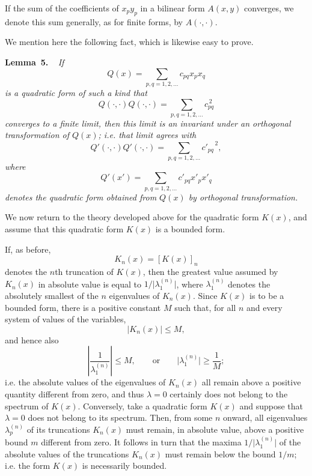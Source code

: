 \documentclass[b5paper,twoside]{article}
\makeatletter
\newcommand{\hilbertstatementname}[2]{%
  \textbf{#1\if\relax\detokenize{#2}\relax\else\ #2\fi.}%
}
\newenvironment{lemma}[1][]{%
  \par\addvspace{.7\baselineskip}%
  \phantomsection
  \protected@edef\@currentlabel{#1}%
  \noindent\hilbertstatementname{Lemma}{#1}\ \itshape\ignorespaces
}{%
  \par\addvspace{.7\baselineskip}%
}
\newcommand{\originalpage}[1]{\phantomsection\label{origpage:#1}}
\makeatother
\begin{document}
If the sum of the coefficients of $x_p y_p$ in a bilinear form $A(x,y)$
converges, we denote this sum generally, as for finite forms, by
$A(\mathord{\cdot},\mathord{\cdot})$.

\originalpage{182}
We mention here the following fact, which is likewise easy to prove.

\begin{lemma}[5]\label{lem:5}
If
\[
  Q(x)=\sum_{p,q=1,2,\ldots}c_{pq}x_p x_q
\]
is a quadratic form of such a kind that
\[
  Q(\mathord{\cdot},\mathord{\cdot})
  Q(\mathord{\cdot},\mathord{\cdot})
  =\sum_{p,q=1,2,\ldots}c_{pq}^{\,2}
\]
converges to a finite limit, then this limit is an invariant under an
orthogonal transformation of $Q(x)$; i.e. that limit agrees with
\[
  Q'(\mathord{\cdot},\mathord{\cdot})
  Q'(\mathord{\cdot},\mathord{\cdot})
  =\sum_{p,q=1,2,\ldots}{c'_{pq}}^{\,2},
\]
where
\[
  Q'(x')=\sum_{p,q=1,2,\ldots}c'_{pq}x'_p x'_q
\]
denotes the quadratic form obtained from $Q(x)$ by orthogonal
transformation.
\end{lemma}

We now return to the theory developed above for the quadratic form $K(x)$,
and assume that this quadratic form $K(x)$ is a bounded form.

If, as before,
\[
  K_n(x)=[K(x)]_n
\]
denotes the $n$th truncation of $K(x)$, then the greatest value assumed by
$K_n(x)$ in absolute value is equal to
$1/\lvert\lambda_1^{(n)}\rvert$, where $\lambda_1^{(n)}$ denotes the
absolutely smallest of the $n$ eigenvalues of $K_n(x)$.  Since $K(x)$ is to
be a bounded form, there is a positive constant $M$ such that, for all $n$
and every system of values of the variables,
\[
  \lvert K_n(x)\rvert\le M,
\]
and hence also
\[
  \left\lvert\frac{1}{\lambda_1^{(n)}}\right\rvert\le M,
  \qquad\text{or}\qquad
  \lvert\lambda_1^{(n)}\rvert\ge\frac1M;
\]
i.e. the absolute values of the eigenvalues of $K_n(x)$ all remain above a
positive quantity different from zero, and thus $\lambda=0$ certainly does
not belong to the spectrum of $K(x)$.  Conversely, take a quadratic form
$K(x)$\originalpage{183} and suppose that $\lambda=0$ does not belong to its
spectrum.  Then, from some $n$ onward, all eigenvalues
$\lambda_p^{(n)}$ of its truncations $K_n(x)$ must remain, in absolute
value, above a positive bound $m$ different from zero.  It follows in turn
that the maxima $1/\lvert\lambda_1^{(n)}\rvert$ of the absolute values of the
truncations $K_n(x)$ must remain below the bound $1/m$; i.e. the form $K(x)$
is necessarily bounded.
\end{document}
